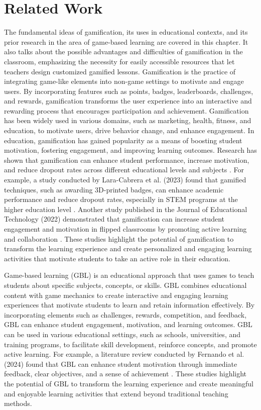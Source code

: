 \chapter{Related Work}\label{chap:relatedwork}
The fundamental ideas of gamification, its uses in educational contexts, and its prior research in the area of game-based learning are covered in this chapter. It also talks about the possible advantages and difficulties of gamification in the classroom, emphasizing the necessity for easily accessible resources that let teachers design customized gamified lessons. Gamification is the practice of integrating game-like elements into non-game settings to motivate and engage users. By incorporating features such as points, badges, leaderboards, challenges, and rewards, gamification transforms the user experience into an interactive and rewarding process that encourages participation and achievement. Gamification has been widely used in various domains, such as marketing, health, fitness, and education, to motivate users, drive behavior change, and enhance engagement. In education, gamification has gained popularity as a means of boosting student motivation, fostering engagement, and improving learning outcomes. Research has shown that gamification can enhance student performance, increase motivation, and reduce dropout rates across different educational levels and subjects \cite{lara2023badges}. For example, a study conducted by Lara-Cabrera et al. (2023) found that gamified techniques, such as awarding 3D-printed badges, can enhance academic performance and reduce dropout rates, especially in STEM programs at the higher education level \cite{lara2023badges}. Another study published in the Journal of Educational Technology (2022) demonstrated that gamification can increase student engagement and motivation in flipped classrooms by promoting active learning and collaboration \cite{jack2024gamification}. These studies highlight the potential of gamification to transform the learning experience and create personalized and engaging learning activities that motivate students to take an active role in their education.

Game-based learning (GBL) is an educational approach that uses games to teach students about specific subjects, concepts, or skills. GBL combines educational content with game mechanics to create interactive and engaging learning experiences that motivate students to learn and retain information effectively. By incorporating elements such as challenges, rewards, competition, and feedback, GBL can enhance student engagement, motivation, and learning outcomes. GBL can be used in various educational settings, such as schools, universities, and training programs, to facilitate skill development, reinforce concepts, and promote active learning. For example, a literature review conducted by Fernando et al. (2024) found that GBL can enhance student motivation through immediate feedback, clear objectives, and a sense of achievement \cite{fernando2024}. These studies highlight the potential of GBL to transform the learning experience and create meaningful and enjoyable learning activities that extend beyond traditional teaching methods.

